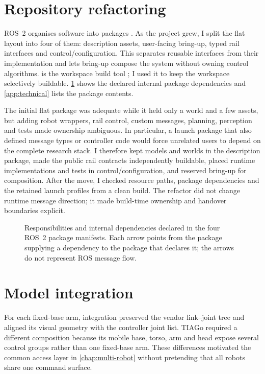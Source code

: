 \section{Repository refactoring}

ROS~2 organises software into packages \citep{ros2packages}. As the project
grew, I split the flat layout into four of them: description assets, user-facing
bring-up, typed rail interfaces and control/configuration. This separates
reusable interfaces from their implementation and lets bring-up compose the
system without owning control algorithms.  is the workspace build
tool \citep{colcon}; I used it to keep the workspace selectively buildable.
\cref{fig:packages} shows the declared internal package dependencies and
\cref{app:technical} lists the package contents.

The initial flat package was adequate while it held only a world and a few
assets, but adding robot wrappers, rail control, custom messages, planning,
perception and tests made ownership ambiguous. In particular, a launch package
that also defined message types or controller code would force unrelated users
to depend on the complete research stack. I therefore kept models and worlds in
the description package, made the public rail contracts independently buildable,
placed runtime implementations and tests in control/configuration, and reserved
bring-up for composition. After the move, I checked resource paths, package
dependencies and the retained launch profiles from a clean build. The refactor
did not change runtime message direction; it made build-time ownership and
handover boundaries explicit.

\FloatBarrier

\begin{figure}[H]
  \centering
  
  \caption[ROS~2 package responsibilities and declared internal dependencies.]
  {Responsibilities and internal dependencies declared in the four ROS~2
  package manifests. Each arrow points from the package supplying a dependency
  to the package that declares it; the arrows do not represent ROS message
  flow.}
  \label{fig:packages}
\end{figure}

\section{Model integration}

For each fixed-base arm, integration preserved the vendor link--joint tree and
aligned its visual geometry with the controller joint list. TIAGo required a
different composition because
its mobile base, torso, arm and head expose several control groups rather than
one fixed-base arm. These differences motivated the common access layer in
\cref{chap:multi-robot} without pretending that all robots share one command
surface.

